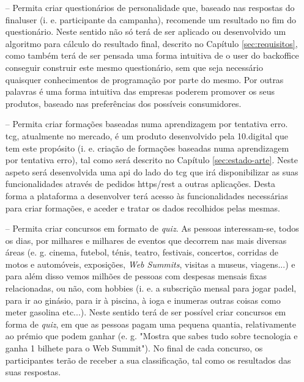 \begin{itemize}
	\item[--] Permita criar questionários de personalidade que, baseado nas respostas do \gls{finaluser} (i. e. participante da campanha), recomende um resultado no fim do questionário. Neste sentido não só terá de ser aplicado ou desenvolvido um algoritmo para cálculo do resultado final, descrito no Capítulo \ref{sec:requisitos}, como também terá de ser pensada uma forma intuitiva de o \gls{user} do \gls{backoffice} conseguir construir este mesmo questionário, sem que seja necessário quaisquer conhecimentos de programação por parte do mesmo. Por outras palavras é uma forma intuitiva das empresas poderem promover os seus produtos, baseado nas preferências dos possíveis consumidores.
	\item[--] Permita criar formações baseadas numa aprendizagem por tentativa erro. \acrfull{tcg}\cite{tcg}, atualmente no mercado, é um produto desenvolvido pela 10.digital que tem este propósito (i. e. criação de formações baseadas numa aprendizagem por tentativa erro), tal como será descrito no Capítulo \ref{sec:estado-arte}. Neste aspeto será desenvolvida uma \acrshort{api} do lado do \acrshort{tcg} que irá disponibilizar as suas funcionalidades através de pedidos \acrshort{https}/\acrshort{rest} a outras aplicações. Desta forma a plataforma a desenvolver terá acesso às funcionalidades necessárias para criar formações, e aceder e tratar os dados recolhidos pelas mesmas.	
	\item[--] Permita criar concursos em formato de \textit{quiz}. As pessoas interessam-se, todos os dias, por milhares e milhares de eventos que decorrem nas mais diversas áreas (e. g. cinema, futebol, ténis, teatro, festivais, concertos, corridas de motos e automóveis, exposições, \textit{Web Summits}\cite{websummit}, visitas a museus, viagens...) e para além disso
	vemos milhões de pessoas com despesas mensais fixas relacionadas, ou não, com hobbies (i. e. a subscrição mensal para jogar padel, para ir ao ginásio, para ir à piscina, à ioga e inumeras outras coisas como meter gasolina etc...). Neste sentido terá de ser possível criar concursos em forma de \textit{quiz}, em que as pessoas pagam uma pequena quantia, relativamente ao prémio que podem ganhar (e. g. "Mostra que sabes tudo sobre tecnologia e ganha 1 bilhete para o Web Summit"). No final de cada concurso, os participantes terão de receber a sua classificação, tal como os resultados das suas respostas.

\end{itemize}
